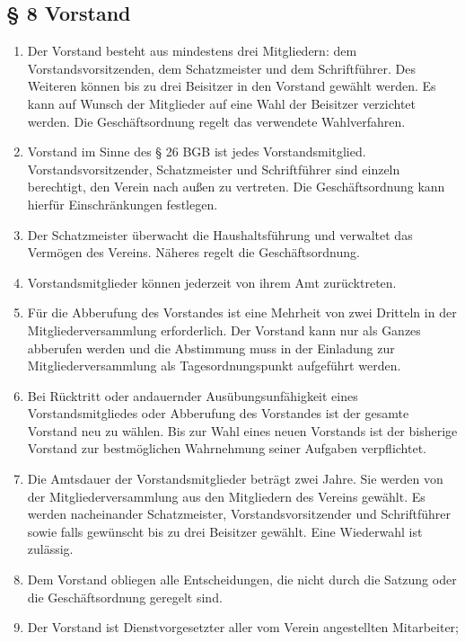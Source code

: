 ﻿\documentclass[10pt,a4paper]{scrartcl}
\begin{document}
\subsection*{§ 8 Vorstand }
\begin{enumerate}

    \item Der Vorstand besteht aus mindestens drei Mitgliedern: dem
    Vorstandsvorsitzenden, dem Schatzmeister und dem Schriftführer. Des
    Weiteren können bis zu drei Beisitzer in den Vorstand gewählt werden. Es
    kann auf Wunsch der Mitglieder auf eine Wahl der Beisitzer verzichtet
    werden. Die Geschäftsordnung regelt das verwendete Wahlverfahren.
    \item Vorstand im Sinne des § 26 BGB ist jedes Vorstandsmitglied.
    Vorstandsvorsitzender, Schatzmeister und Schriftführer sind einzeln
    berechtigt, den Verein nach außen zu vertreten. Die Geschäftsordnung kann
    hierfür Einschränkungen festlegen.
	\item Der Schatzmeister über\-wacht die Haushaltsführung und verwaltet das
		Ver\-mö\-gen des Vereins. Nä\-her\-es regelt die Ge\-schäfts\-ord\-nung.
	\item Vorstandsmitglieder können jederzeit von ihrem Amt zurücktreten.
        \item Für die Abberufung des Vorstandes ist eine Mehrheit von zwei Dritteln in der Mitgliederversammlung erforderlich. Der Vorstand kann nur als Ganzes abberufen werden und die Abstimmung muss in der Einladung zur Mitgliederversammlung als Tagesordnungspunkt aufgeführt werden.
        \item Bei Rücktritt oder andauernder Ausübungsunfähigkeit eines Vorstandsmitgliedes oder Abberufung
		des Vorstandes ist der gesamte Vorstand neu zu wählen. Bis zur Wahl eines neuen Vorstands ist der
		bisherige Vorstand zur bestmöglichen Wahrnehmung seiner Aufgaben verpflichtet.
    \item Die Amtsdauer der Vorstandsmitglieder beträgt zwei Jahre. Sie werden
    von der Mitgliederversammlung aus den Mitgliedern des Vereins gewählt. Es
    werden nacheinander Schatzmeister, Vorstandsvorsitzender und Schriftführer
    sowie falls gewünscht bis zu drei Beisitzer gewählt. Eine Wiederwahl ist
    zulässig.
    \item Dem Vorstand obliegen alle Entscheidungen, die nicht durch die Satzung oder die Geschäftsordnung geregelt sind.
	\item Der Vorstand ist Dienstvorgesetzter aller vom Verein angestellten Mitarbeiter;

\end{enumerate}
\end{document}
